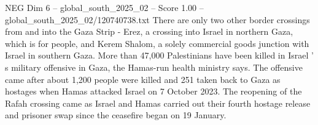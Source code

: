 \begin{textsample}{NEG Dim 6 – global\_south\_2025\_02 – Score 1.00 – global\_south\_2025\_02/120740738.txt}
There are only two other border crossings from and into the Gaza Strip - Erez, a crossing into Israel in northern Gaza, which is for people, and Kerem Shalom, a solely commercial goods junction with Israel in southern Gaza.
More than 47,000 Palestinians have been killed in Israel ' s military offensive in Gaza, the Hamas-run health ministry says.
The offensive came after about 1,200 people were killed and 251 taken back to Gaza as hostages when Hamas attacked Israel on 7 October 2023.
The reopening of the Rafah crossing came as Israel and Hamas carried out their fourth hostage release and prisoner swap since the ceasefire began on 19 January.

\end{textsample}
